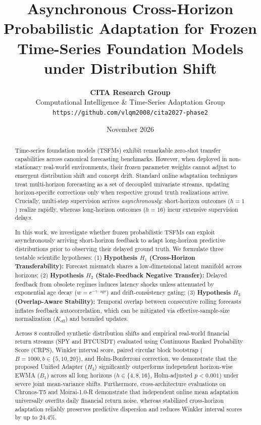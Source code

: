 \documentclass{article}
\title{\textbf{Asynchronous Cross-Horizon Probabilistic Adaptation for Frozen Time-Series Foundation Models under Distribution Shift}}
\author{
  \textbf{CITA Research Group}\\
  Computational Intelligence \& Time-Series Adaptation Group\\
  \texttt{https://github.com/vlqm2008/cita2027-phase2}
}
\date{November 2026}
\begin{document}
\maketitle

\begin{abstract}
Time-series foundation models (TSFMs) exhibit remarkable zero-shot transfer capabilities across canonical forecasting benchmarks. However, when deployed in non-stationary real-world environments, their frozen parameter weights cannot adjust to emergent distribution shift and concept drift. Standard online adaptation techniques treat multi-horizon forecasting as a set of decoupled univariate streams, updating horizon-specific corrections only when respective ground truth realizations arrive. Crucially, multi-step supervision arrives \emph{asynchronously}: short-horizon outcomes ($h=1$) realize rapidly, whereas long-horizon outcomes ($h=16$) incur extensive supervision delays.

In this work, we investigate whether frozen probabilistic TSFMs can exploit asynchronously arriving short-horizon feedback to adapt long-horizon predictive distributions prior to observing their delayed ground truth. We formulate three testable scientific hypotheses:
(1) \textbf{Hypothesis $H_1$ (Cross-Horizon Transferability):} Forecast mismatch shares a low-dimensional latent manifold across horizons;
(2) \textbf{Hypothesis $H_2$ (Stale-Feedback Negative Transfer):} Delayed feedback from obsolete regimes induces latency shocks unless attenuated by exponential age decay ($w = e^{-\gamma \cdot \text{age}}$) and drift-consistency gating;
(3) \textbf{Hypothesis $H_3$ (Overlap-Aware Stability):} Temporal overlap between consecutive rolling forecasts inflates feedback autocorrelation, which can be mitigated via effective-sample-size normalization ($K_{\text{eff}}$) and bounded updates.

Across 8 controlled synthetic distribution shifts and empirical real-world financial return streams (SPY and BTCUSDT) evaluated using Continuous Ranked Probability Score (CRPS), Winkler interval score, paired circular block bootstrap ($B=1000, b \in \{5, 10, 20\}$), and Holm-Bonferroni correction, we demonstrate that the proposed Unified Adapter ($H_3$) significantly outperforms independent horizon-wise EWMA ($B_1$) across all long horizons ($h \in \{4, 8, 16\}$, Holm-adjusted $p < 0.001$) under severe joint mean-variance shifts. Furthermore, cross-architecture evaluations on Chronos-T5 and Moirai-1.0-R demonstrate that independent online mean adaptation universally overfits daily financial return noise, whereas stabilized cross-horizon adaptation reliably preserves predictive dispersion and reduces Winkler interval scores by up to 24.4\%.
\end{abstract}
\end{document}
